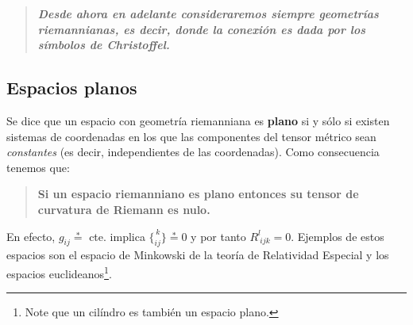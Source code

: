 
\begin{quotation}
\textbf{\textit{Desde ahora en adelante consideraremos siempre geometrías riemannianas, es
decir, donde la conexión es dada por los símbolos de Christoffel.}}
\end{quotation}

\subsection{Espacios planos}
Se dice que un espacio con geometría riemanniana es \textbf{plano} si y sólo si existen sistemas de coordenadas en los que las componentes del tensor métrico sean \textit{constantes} (es decir, independientes de las coordenadas). Como consecuencia tenemos que:
\begin{quotation}
\textbf{Si un espacio riemanniano es plano entonces su tensor de curvatura de Riemann es nulo.}
\end{quotation}
En efecto, $g_{ij}\overset{\ast}{=}$ cte. implica $\{ _{ i j}^{\, k}\}
\overset{\ast}{=}0$ y por tanto $R_{\ i j k}^l=0$. Ejemplos de estos
espacios son el espacio de Minkowski de la teoría de Relatividad Especial y
los espacios euclideanos\footnote{Note que un cilíndro es también un espacio plano.}.

